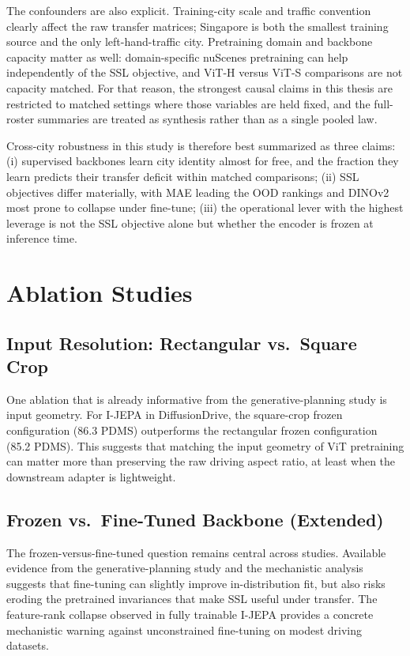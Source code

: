 The confounders are also explicit. Training-city scale and traffic convention clearly affect the raw transfer matrices; Singapore is both the smallest training source and the only left-hand-traffic city. Pretraining domain and backbone capacity matter as well: domain-specific nuScenes pretraining can help independently of the SSL objective, and ViT-H versus ViT-S comparisons are not capacity matched. For that reason, the strongest causal claims in this thesis are restricted to matched settings where those variables are held fixed, and the full-roster summaries are treated as synthesis rather than as a single pooled law.

Cross-city robustness in this study is therefore best summarized as three claims:
(i) supervised backbones learn city identity almost for free, and the fraction they learn predicts their transfer deficit within matched comparisons;
(ii) SSL objectives differ materially, with MAE leading the OOD rankings and DINOv2 most prone to collapse under fine-tune;
(iii) the operational lever with the highest leverage is not the SSL objective alone but whether the encoder is frozen at inference time.

\section{Ablation Studies}
\label{sec:exp-ablations}

\subsection{Input Resolution: Rectangular vs.\ Square Crop}
One ablation that is already informative from the generative-planning study is input geometry. For I-JEPA in DiffusionDrive, the square-crop frozen configuration (86.3 PDMS) outperforms the rectangular frozen configuration (85.2 PDMS). This suggests that matching the input geometry of ViT pretraining can matter more than preserving the raw driving aspect ratio, at least when the downstream adapter is lightweight.

\subsection{Frozen vs.\ Fine-Tuned Backbone (Extended)}
The frozen-versus-fine-tuned question remains central across studies. Available evidence from the generative-planning study and the mechanistic analysis suggests that fine-tuning can slightly improve in-distribution fit, but also risks eroding the pretrained invariances that make SSL useful under transfer. The feature-rank collapse observed in fully trainable I-JEPA provides a concrete mechanistic warning against unconstrained fine-tuning on modest driving datasets.

